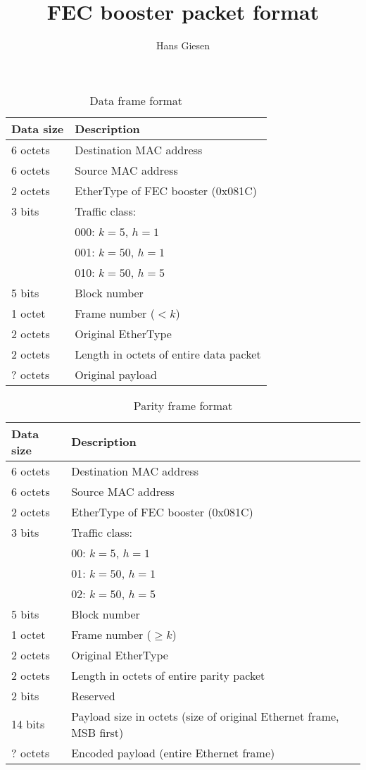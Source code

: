 \documentclass{article}
\begin{document}
  \title{FEC booster packet format}

  \author{Hans Giesen}

  \maketitle  

  \begin{table}
    \begin{tabular}{l l}
      \toprule
        Data size & Description \\
      \midrule
        6 octets & Destination MAC address \\
        6 octets & Source MAC address \\
        2 octets & EtherType of FEC booster (0x081C) \\
        3 bits & Traffic class: \\
               & 000: $k = 5$, $h = 1$ \\
               & 001: $k = 50$, $h = 1$ \\
               & 010: $k = 50$, $h = 5$ \\
        5 bits & Block number \\
        1 octet & Frame number ($< k$) \\
        2 octets & Original EtherType \\
        2 octets & Length in octets of entire data packet \\
        ? octets & Original payload \\
      \bottomrule
    \end{tabular}
    \caption{Data frame format}
  \end{table}

  \begin{table}
    \begin{tabular}{l l}
      \toprule
        Data size & Description \\
      \midrule
        6 octets & Destination MAC address \\
        6 octets & Source MAC address \\
        2 octets & EtherType of FEC booster (0x081C) \\
        3 bits & Traffic class: \\
               & 00: $k = 5$, $h = 1$ \\
               & 01: $k = 50$, $h = 1$ \\
               & 02: $k = 50$, $h = 5$ \\
        5 bits & Block number \\
        1 octet & Frame number ($\ge k$) \\
        2 octets & Original EtherType \\
        2 octets & Length in octets of entire parity packet \\
	2 bits & Reserved \\
        14 bits & Payload size in octets (size of original Ethernet frame, MSB first) \\
        ? octets & Encoded payload (entire Ethernet frame) \\
      \bottomrule
    \end{tabular}
    \caption{Parity frame format}
  \end{table}
\end{document}
